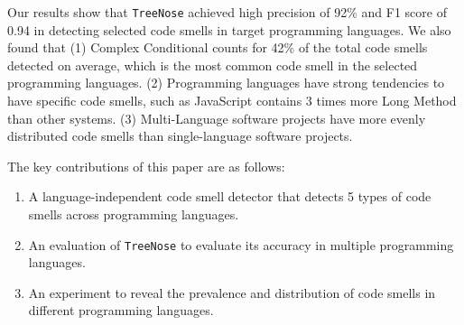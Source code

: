 Our results show that \texttt{TreeNose} achieved high precision of 92\% and F1
score of 0.94 in detecting selected code smells in target programming languages.
We also found that (1) Complex Conditional counts for 42\% of the total code
smells detected on average, which is the most common code smell in the selected
programming languages. (2) Programming languages have strong tendencies to have
specific code smells, such as JavaScript contains 3 times more Long Method than
other systems. (3) Multi-Language software projects have more evenly distributed
code smells than single-language software projects.


The key contributions of this paper are as follows:

\begin{enumerate}
    \item A language-independent code smell detector that detects 5 types of
        code smells across programming languages.
    \item An evaluation of \texttt{TreeNose} to evaluate its accuracy in
        multiple programming languages.
    \item An experiment to reveal the prevalence and distribution of code smells
        in different programming languages.
\end{enumerate}

